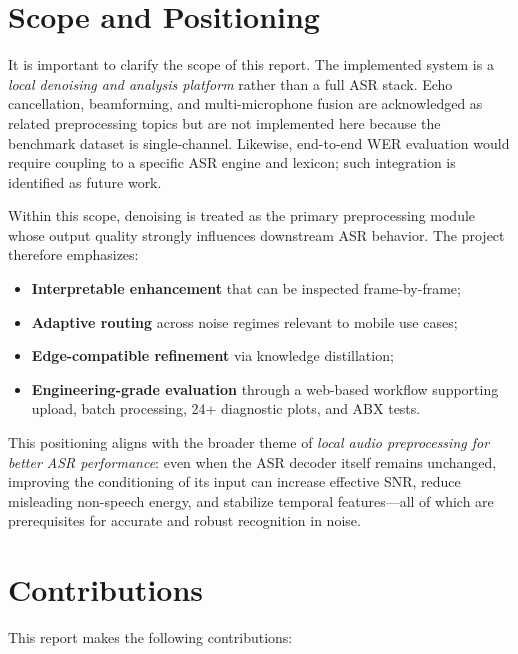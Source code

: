 \section{Scope and Positioning}
\label{sec:scope}

It is important to clarify the scope of this report. The implemented system is a \emph{local denoising and analysis platform} rather than a full ASR stack. Echo cancellation, beamforming, and multi-microphone fusion are acknowledged as related preprocessing topics but are not implemented here because the benchmark dataset is single-channel. Likewise, end-to-end WER evaluation would require coupling to a specific ASR engine and lexicon; such integration is identified as future work.

Within this scope, denoising is treated as the primary preprocessing module whose output quality strongly influences downstream ASR behavior. The project therefore emphasizes:
\begin{itemize}
  \item \textbf{Interpretable enhancement} that can be inspected frame-by-frame;
  \item \textbf{Adaptive routing} across noise regimes relevant to mobile use cases;
  \item \textbf{Edge-compatible refinement} via knowledge distillation;
  \item \textbf{Engineering-grade evaluation} through a web-based workflow supporting upload, batch processing, 24+ diagnostic plots, and ABX tests.
\end{itemize}
This positioning aligns with the broader theme of \emph{local audio preprocessing for better ASR performance}: even when the ASR decoder itself remains unchanged, improving the conditioning of its input can increase effective SNR, reduce misleading non-speech energy, and stabilize temporal features---all of which are prerequisites for accurate and robust recognition in noise.

\section{Contributions}
\label{sec:contributions}

This report makes the following contributions:

